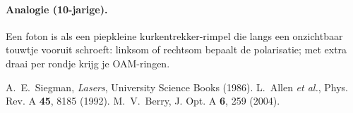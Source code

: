 \documentclass[aps,prb,preprint,amsmath,amssymb]{revtex4-2} %
\begin{document}
    \paragraph{Analogie (10-jarige).}
        Een foton is als een piepkleine kurkentrekker-rimpel die langs een onzichtbaar touwtje vooruit schroeft:
        linksom of rechtsom bepaalt de polarisatie; met extra draai per rondje krijg je OAM-ringen.


        
        \begin{thebibliography}{9}
             A.~E.~Siegman, \emph{Lasers}, University Science Books (1986).
             L.~Allen \emph{et al.}, Phys. Rev. A \textbf{45}, 8185 (1992).
             M.~V.~Berry, J. Opt. A \textbf{6}, 259 (2004).
        \end{thebibliography}
\end{document}
